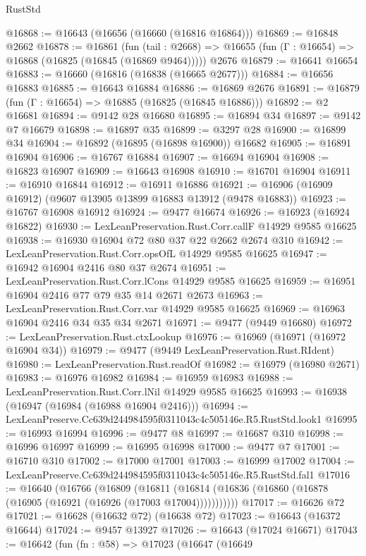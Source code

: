 \begin{lexlean}{RustStd}
\begin{coremodule}
@16868 := @16643 (@16656 (@16660 (@16816 @16864)))
@16869 := @16848 @2662
@16878 := @16861
    (fun (tail : @2668) => @16655 (fun (Γ : @16654) => @16868 (@16825 (@16845 (@16869 @9464)))))
    @2676
@16879 := @16641 @16654
@16883 := @16660 (@16816 (@16838 (@16665 @2677)))
@16884 := @16656 @16883
@16885 := @16643 @16884
@16886 := @16869 @2676
@16891 := @16879 (fun (Γ : @16654) => @16885 (@16825 (@16845 @16886)))
@16892 := @2 @16681
@16894 := @9142 @28 @16680
@16895 := @16894 @34
@16897 := @9142 @7 @16679
@16898 := @16897 @35
@16899 := @3297 @28
@16900 := @16899 @34
@16904 := @16892 (@16895 (@16898 @16900)) @16682
@16905 := @16891 @16904
@16906 := @16767 @16884
@16907 := @16694 @16904
@16908 := @16823 @16907
@16909 := @16643 @16908
@16910 := @16701 @16904
@16911 := @16910 @16844
@16912 := @16911 @16886
@16921 := @16906 (@16909 @16912) (@9607 @13905 @13899 @16883 @13912 (@9478 @16883))
@16923 := @16767 @16908 @16912
@16924 := @9477 @16674
@16926 := @16923 (@16924 @16822)
@16930 := LexLeanPreservation.Rust.Corr.callF @14929 @9585 @16625
@16938 := @16930 @16904 @72 @80 @37 @22 @2662 @2674 @310
@16942 := LexLeanPreservation.Rust.Corr.opsOfL @14929 @9585 @16625
@16947 := @16942 @16904 @2416 @80 @37 @2674
@16951 := LexLeanPreservation.Rust.Corr.lCons @14929 @9585 @16625
@16959 := @16951 @16904 @2416 @77 @79 @35 @14 @2671 @2673
@16963 := LexLeanPreservation.Rust.Corr.var @14929 @9585 @16625
@16969 := @16963 @16904 @2416 @34 @35 @34 @2671
@16971 := @9477 (@9449 @16680)
@16972 := LexLeanPreservation.Rust.ctxLookup
@16976 := @16969 (@16971 (@16972 @16904 @34))
@16979 := @9477 (@9449 LexLeanPreservation.Rust.RIdent)
@16980 := LexLeanPreservation.Rust.readOf
@16982 := @16979 (@16980 @2671)
@16983 := @16976 @16982
@16984 := @16959 @16983
@16988 := LexLeanPreservation.Rust.Corr.lNil @14929 @9585 @16625
@16993 := @16938 (@16947 (@16984 (@16988 @16904 @2416)))
@16994 := LexLeanPreserve.Cc639d244984595f0311043c4c505146e.R5.RustStd.look1
@16995 := @16993 @16994
@16996 := @9477 @8
@16997 := @16687 @310
@16998 := @16996 @16997
@16999 := @16995 @16998
@17000 := @9477 @7
@17001 := @16710 @310
@17002 := @17000 @17001
@17003 := @16999 @17002
@17004 := LexLeanPreserve.Cc639d244984595f0311043c4c505146e.R5.RustStd.fal1
@17016 := @16640
    (@16766
      (@16809
        (@16811 (@16814 (@16836 (@16860 (@16878 (@16905 (@16921 (@16926 (@17003 @17004)))))))))))
@17017 := @16626 @72
@17021 := @16628 (@16632 @72) (@16638 @72)
@17023 := @16643 (@16372 @16644)
@17024 := @9457 @13927
@17026 := @16643 (@17024 @16671)
@17043 := @16642
    (fun (fn : @58) =>
    @17023
      (@16647
        (@16649

\end{coremodule}
\end{lexlean}
